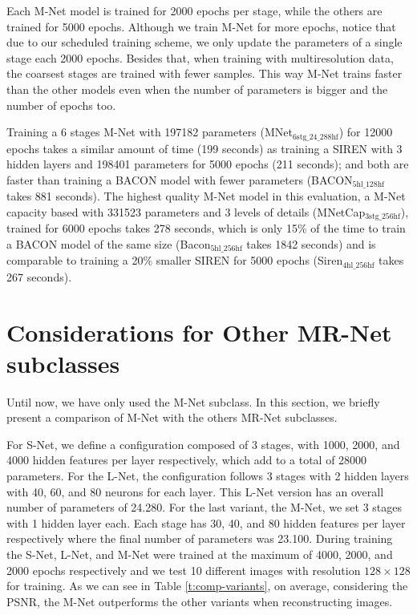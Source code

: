 Each M-Net model is trained for 2000 epochs per stage, while the others are trained for 5000 epochs. Although we train M-Net for more epochs, notice that due to our scheduled training scheme, we only update the parameters of a single stage each 2000 epochs. Besides that, when training with multiresolution data, the coarsest stages are trained with fewer samples. This way M-Net trains faster than the other models even when the number of parameters is bigger and the number of epochs too. 

Training a 6 stages M-Net with 197182 parameters (MNet$_\text{6stg\_24\_288hf}$) for 12000 epochs takes a similar amount of time (199 seconds) as training a SIREN with 3 hidden layers and 198401 parameters for 5000 epochs (211 seconds); and both are faster than training a BACON model with fewer parameters (BACON$_\text{5hl\_128hf}$ takes 881 seconds). The highest quality M-Net model in this evaluation, a M-Net capacity based with 331523 parameters and 3 levels of details (MNetCap$_\text{3stg\_256hf}$), trained for 6000 epochs takes 278 seconds, which is only 15\% of the time to train a BACON model of the same size (Bacon$_\text{5hl\_256hf}$ takes 1842 seconds) and is comparable to training a 20\% smaller SIREN for 5000 epochs (Siren$_\text{4hl\_256hf}$ takes 267 seconds).


\section{Considerations for Other MR-Net subclasses}\label{sec:considerations}

Until now, we have only used the M-Net subclass. In this section, we briefly present a comparison of M-Net with the others MR-Net subclasses.

For S-Net, we define a configuration composed of 3 stages, with 1000, 2000, and 4000 hidden features per layer respectively, which add to a total of 28000 parameters. For the L-Net, the configuration follows 3 stages with 2 hidden layers with 40, 60, and 80 neurons for each layer. This L-Net version has an overall number of parameters of 24.280. For the last variant, the M-Net, we set 3 stages with 1 hidden layer each. Each stage has 30, 40, and 80 hidden features per layer respectively where the final number of parameters was 23.100. During training the S-Net, L-Net, and M-Net were trained at the maximum of 4000, 2000, and 2000 epochs respectively and we test 10 different images with resolution $128 \times 128$ for training. 
As we can see in Table \ref{t:comp-variants}, on average, considering the PSNR, the M-Net outperforms the other variants when reconstructing images.

